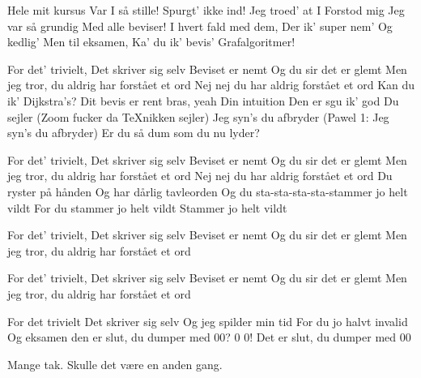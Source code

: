 \documentclass[a4paper,11pt]{article}
\begin{document}
\begin{song}
 Hele mit kursus
Var I så stille!
Spurgt’ ikke ind!
Jeg troed’ at I
Forstod mig
 Jeg var så grundig
Med alle beviser!
 I hvert fald med dem,
 Der ik’ super nem’
 Og kedlig’
 Men til eksamen,
Ka’ du ik’ bevis’
Grafalgoritmer!

 For det’ trivielt,
Det skriver sig selv
Beviset er nemt
Og du sir det er glemt
Men jeg tror, du aldrig har forstået et ord
 Nej nej
 du har aldrig forstået et ord
Kan du ik’ Dijkstra's?
		Dit bevis er rent bras, yeah
 Din intuition
 Den er sgu ik’ god
 Du sejler (Zoom fucker da TeXnikken sejler)
Jeg syn’s du afbryder (Pawel 1: Jeg syn’s du afbryder)
Er du så dum som du nu lyder? 

For det’ trivielt,
Det skriver sig selv
Beviset er nemt
Og du sir det er glemt
Men jeg tror, du aldrig har forstået et ord
 Nej nej
 du har aldrig forstået et ord	
Du ryster på hånden
		Og har dårlig tavleorden
 Og du sta-sta-sta-sta-stammer jo helt vildt
For du stammer jo helt vildt
 Stammer jo helt vildt

 For det’ trivielt,
Det skriver sig selv
Beviset er nemt
Og du sir det er glemt
Men jeg tror, du aldrig har forstået et ord

 For det’ trivielt,
Det skriver sig selv
Beviset er nemt
Og du sir det er glemt
Men jeg tror, du aldrig har forstået et ord

 For det trivielt
Det skriver sig selv
 Og jeg spilder min tid
For du jo halvt invalid
Og eksamen den er slut, 
 du dumper med 00?
 0 0!
 Det er slut, du dumper med 00
\end{song}

\begin{sketch}
 Mange tak.
 Skulle det være en anden gang.

\end{sketch}
\end{document}
